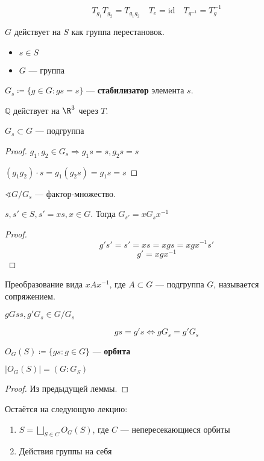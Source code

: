 \begin{remark}
    \[T_{g_1} T_{g_2} = T_{g_1g_2} \quad T_e = \mathrm{id} \quad T_{g^{-1}} = T_g^{-1}\]
\end{remark}

\(G\) действует на \(S\) как группа перестановок.

\begin{definition}\itemfix
    \begin{itemize}
        \item \(s \in S\)
        \item \(G\) --- группа
    \end{itemize}

    \(G_s \coloneqq \{g \in G : gs = s\}\) --- \textbf{стабилизатор} элемента \(s\).
\end{definition}

\begin{example}
    \(\mathbb{Q}\) действует на \(\R^3\) через \(T\).
\end{example}

\begin{lemma}
    \(G_s \subset G\) --- подгруппа
\end{lemma}
\begin{proof}
    \(g_1, g_2 \in G_s \Rightarrow g_1 s = s, g_2 s = s\)

    \((g_1g_2) \cdot s = g_1(g_2 s) = g_1s = s\)
\end{proof}

\(\sphericalangle G / G_s\) --- фактор-множество.

\begin{lemma}
    \(s, s' \in S, s' = xs, x \in G\). Тогда \(G_{s'} = xG_sx^{-1}\)
\end{lemma}
\begin{proof}
    \[g's' = s' = xs = xgs = xgx^{-1}s'\]
    \[g' = xgx^{-1}\]
\end{proof}

\begin{definition}
    Преобразование вида \(xAx^{-1}\), где \(A \subset G\) --- подгруппа \(G\), называется сопряжением.
\end{definition}

\begin{lemma}
    \(gGss, g'G_s \in G / G_s\)

    \[gs = g's \Leftrightarrow g G_s = g' G_s\]
\end{lemma}

\begin{definition}
    \(O_G(S) \coloneqq \{gs : g \in G\}\) --- \textbf{орбита}
\end{definition}

\begin{lemma}
    \(|O_G(S)| = (G : G_S)\)
\end{lemma}
\begin{proof}
    Из предыдущей леммы.
\end{proof}

Остаётся на следующую лекцию:
\begin{enumerate}
    \item \(S = \bigsqcup_{S \in C} O_G(S)\), где \(C\) --- непересекающиеся орбиты
    \item Действия группы на себя
\end{enumerate}
